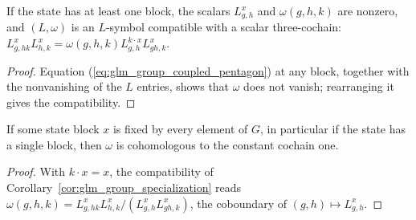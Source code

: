 \begin{corollary}
    \leanok
    \label{cor:glm_group_specialization}
    If the state has at least one block, the scalars $L^x_{g,h}$ and
    $\omega(g,h,k)$ are nonzero, and $(L,\omega)$ is an $L$-symbol compatible
    with a scalar three-cochain:
    $L^x_{g,hk}L^x_{h,k}=\omega(g,h,k)L^{k\cdot x}_{g,h}L^x_{gh,k}$.
\end{corollary}
\begin{proof}
    \leanok
    Equation (\ref{eq:glm_group_coupled_pentagon}) at any block, together
    with the nonvanishing of the $L$ entries, shows that $\omega$ does not
    vanish; rearranging it gives the compatibility.
\end{proof}

\begin{corollary}
    \leanok
    \label{cor:glm_group_single_block_trivial}
    If some state block $x$ is fixed by every element of $G$, in particular if
    the state has a single block, then $\omega$ is cohomologous to the
    constant cochain one.
\end{corollary}
\begin{proof}
    \leanok
    With $k\cdot x=x$, the compatibility of
    Corollary~\ref{cor:glm_group_specialization} reads
    $\omega(g,h,k)=L^x_{g,hk}L^x_{h,k}/(L^x_{g,h}L^x_{gh,k})$, the
    coboundary of $(g,h)\mapsto L^x_{g,h}$.
\end{proof}
